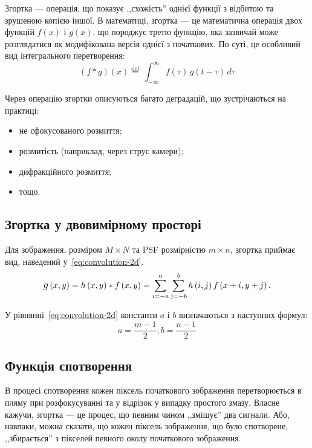 \documentclass{diploma}
\begin{document}
    Згортка --- операція, що показує ,,схожість'' однієї функції з
    відбитою та зрушеною копією іншої.
    В математиці, згортка --- це математична операція двох функцій $f\left(
    x \right)$ і $g\left( x \right)$, що породжує третю функцію, яка зазвичай
    може розглядатися як модифікована версія однієї з початкових.
    По суті, це особливий вид інтегрального перетворення:
    \begin{equation}
      \left( f * g \right)\left( x \right) \stackrel{\mathrm{def}}{=}\
      \int_{-\infty}^\infty f(\tau)\, g(t - \tau)\, d\tau
      \label{eq:convolution-definition}
    \end{equation}

    Через операцію згортки описуються багато деградацій, що зустрічаються на
    практиці:
    \begin{itemize}
      \item не сфокусованого розмиття;
      \item розмитість (наприклад, через струс камери);
      \item дифракційного розмиття;
      \item тощо.
    \end{itemize}
    \clearpage
    \subsection{Згортка у двовимірному просторі}
      Для зображення, розміром $M \times N$ та PSF розмірністю $m \times n$,
      згортка приймає вид, наведений у~\eqref{eq:convolution-2d}.
      \begin{equation}
        \mathlarger
        g\left( x, y \right) = h\left( x, y \right) \ast f\left( x, y \right)
        = \sum_{i=-a}^a \sum_{j = -b}^b h\left( i, j \right) f\left( x + i, y
        + j \right).
        \label{eq:convolution-2d}
      \end{equation}

      У рівнянні~\eqref{eq:convolution-2d} константи $a$ і $b$ визначаються з
      наступних формул:
      \begin{equation*}
        a = \frac{m - 1}{2}, b = \frac{n - 1}{2}
      \end{equation*}
    \clearpage
    \subsection{Функція спотворення}
      В процесі спотворення кожен піксель початкового зображення
      перетворюється в пляму при розфокусуванні та у відрізок у випадку
      простого змазу.
      Власне кажучи, згортка --- це процес, що певним чином ,,змішує'' два
      сигнали.
      Або, навпаки, можна сказати, що кожен піксель зображення, що було
      спотворене, ,,збирається'' з пікселей певного околу початкового
      зображення.
\end{document}
